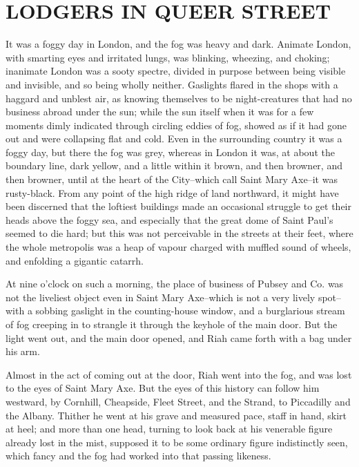 
\chapter{LODGERS IN QUEER STREET}

It was a foggy day in London, and the fog was heavy and dark. Animate
London, with smarting eyes and irritated lungs, was blinking, wheezing,
and choking; inanimate London was a sooty spectre, divided in purpose
between being visible and invisible, and so being wholly neither.
Gaslights flared in the shops with a haggard and unblest air, as knowing
themselves to be night-creatures that had no business abroad under the
sun; while the sun itself when it was for a few moments dimly indicated
through circling eddies of fog, showed as if it had gone out and were
collapsing flat and cold. Even in the surrounding country it was a foggy
day, but there the fog was grey, whereas in London it was, at about
the boundary line, dark yellow, and a little within it brown, and then
browner, and then browner, until at the heart of the City--which call
Saint Mary Axe--it was rusty-black. From any point of the high ridge of
land northward, it might have been discerned that the loftiest buildings
made an occasional struggle to get their heads above the foggy sea, and
especially that the great dome of Saint Paul’s seemed to die hard; but
this was not perceivable in the streets at their feet, where the whole
metropolis was a heap of vapour charged with muffled sound of wheels,
and enfolding a gigantic catarrh.

At nine o’clock on such a morning, the place of business of Pubsey and
Co. was not the liveliest object even in Saint Mary Axe--which is not a
very lively spot--with a sobbing gaslight in the counting-house window,
and a burglarious stream of fog creeping in to strangle it through the
keyhole of the main door. But the light went out, and the main door
opened, and Riah came forth with a bag under his arm.

Almost in the act of coming out at the door, Riah went into the fog, and
was lost to the eyes of Saint Mary Axe. But the eyes of this history
can follow him westward, by Cornhill, Cheapside, Fleet Street, and the
Strand, to Piccadilly and the Albany. Thither he went at his grave and
measured pace, staff in hand, skirt at heel; and more than one head,
turning to look back at his venerable figure already lost in the mist,
supposed it to be some ordinary figure indistinctly seen, which fancy
and the fog had worked into that passing likeness.

